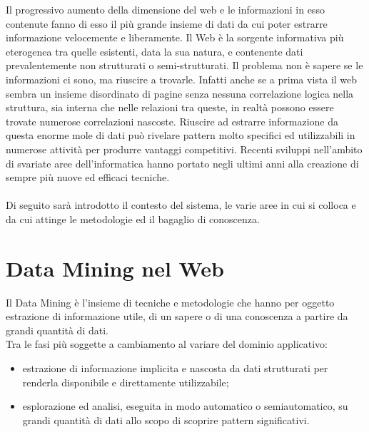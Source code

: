 


Il progressivo aumento della dimensione del web e le informazioni in esso contenute fanno di esso il più grande insieme di dati da cui poter estrarre informazione velocemente e liberamente. Il Web è la sorgente informativa più eterogenea tra quelle esistenti, data la sua natura, e contenente dati prevalentemente non strutturati o semi-strutturati. Il problema non è sapere se le informazioni ci sono, ma riuscire a trovarle. Infatti anche se a prima vista il web sembra un insieme disordinato di pagine senza nessuna correlazione logica nella struttura, sia interna che nelle relazioni tra queste, in realtà possono essere trovate numerose correlazioni  nascoste. Riuscire ad estrarre informazione da questa enorme mole di dati può rivelare pattern molto specifici ed utilizzabili in numerose attività per produrre vantaggi competitivi. Recenti sviluppi nell'ambito di svariate aree dell'informatica hanno portato negli ultimi anni alla creazione di sempre più nuove ed efficaci tecniche. 
\\\\
Di seguito sarà introdotto il contesto del sistema, le varie aree in cui si colloca e da cui attinge le metodologie ed il bagaglio di conoscenza.
\section{Data Mining nel Web}
Il Data Mining è l'insieme di tecniche e metodologie che hanno per oggetto estrazione di informazione utile, di un sapere o di una conoscenza a partire da grandi quantità di dati.
\\
Tra le fasi più soggette a cambiamento al variare del dominio applicativo:
\begin{itemize}
\item estrazione di informazione implicita e nascosta da dati strutturati per renderla disponibile e direttamente utilizzabile; 
\item esplorazione ed analisi, eseguita in modo automatico o semiautomatico, su grandi quantità di dati allo scopo di scoprire pattern significativi.
\end{itemize}

